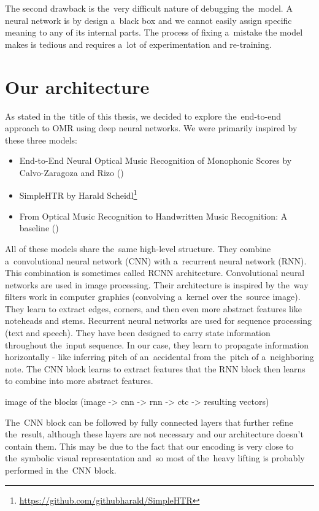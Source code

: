 The second drawback is the~very difficult nature of debugging the~model. A neural network is by design a~black box and we cannot easily assign specific meaning to any of its internal parts. The process of fixing a~mistake the model makes is tedious and requires a~lot of experimentation and re-training.


\section{Our architecture}

As stated in the~title of this thesis, we decided to explore the~end-to-end approach to OMR using deep neural networks. We were primarily inspired by these three models:

\begin{itemize}
\item End-to-End Neural Optical Music Recognition of Monophonic Scores by Calvo-Zaragoza and Rizo (\cite{Primus})
\item SimpleHTR by Harald Scheidl\footnote{\href{https://github.com/githubharald/SimpleHTR}{https://github.com/githubharald/SimpleHTR}}
\item From Optical Music Recognition to Handwritten Music Recognition: A baseline (\cite{HmrBaseline})
\end{itemize}

All of these models share the~same high-level structure. They combine a~convolutional neural network (CNN) with a~recurrent neural network (RNN). This combination is sometimes called RCNN architecture. Convolutional neural networks are used in image processing. Their architecture is inspired by the~way filters work in computer graphics (convolving a~kernel over the~source image). They learn to extract edges, corners, and then even more abstract features like noteheads and stems. Recurrent neural networks are used for sequence processing (text and speech). They have been designed to carry state information throughout the~input sequence. In our case, they learn to propagate information horizontally - like inferring pitch of an~accidental from the~pitch of a~neighboring note. The CNN block learns to extract features that the RNN block then learns to combine into more abstract features.

\begin{code}
image of the blocks
(image -> cnn -> rnn -> ctc -> resulting vectors)
\end{code}

The~CNN block can be followed by fully connected layers that further refine the~result, although these layers are not necessary and our architecture doesn't contain them. This may be due to the fact that our encoding is very close to the~symbolic visual representation and~so most of the~heavy lifting is probably performed in the~CNN block.

